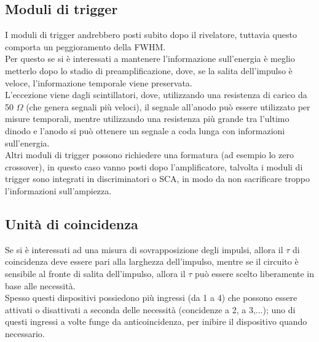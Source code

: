 \subsection{Moduli di trigger}
I moduli di trigger andrebbero posti subito dopo il rivelatore, tuttavia questo comporta un peggioramento della FWHM.\\
Per questo se si \`e interessati a mantenere l'informazione sull'energia \`e meglio metterlo dopo lo stadio di preamplificazione, dove,
se la salita dell'impulso \`e veloce, l'informazione temporale viene preservata.\\
L'eccezione viene dagli scintillatori, dove, utilizzando una resistenza di carico da 50 $\Omega$ (che genera segnali pi\`u veloci), il segnale all'anodo pu\`o essere utilizzato per misure temporali, 
mentre utilizzando una resistenza pi\`u grande tra l'ultimo dinodo e l'anodo si pu\`o ottenere un segnale a coda lunga con informazioni sull'energia.\\
Altri moduli di trigger possono richiedere una formatura (ad esempio lo zero crossover), in questo caso vanno posti dopo l'amplificatore,
talvolta i moduli di trigger sono integrati in discriminatori o SCA, in modo da non sacrificare troppo l'informazioni sull'ampiezza.
\subsection{Unit\`a di coincidenza}
Se si \`e interessati ad una misura di sovrapposizione degli impulsi, allora il $\tau$ di coincidenza deve essere pari alla larghezza dell'impulso, mentre
se il circuito \`e sensibile al fronte di salita dell'impulso, allora il $\tau$ pu\`o essere scelto liberamente in base alle necessit\`a.\\
Spesso questi dispositivi possiedono pi\`u ingressi (da 1 a 4) che possono essere attivati o disattivati a seconda delle necessit\`a (concidenze a 2, a 3,...);
uno di questi ingressi a volte funge da anticoincidenza, per inibire il dispositivo quando necessario.
